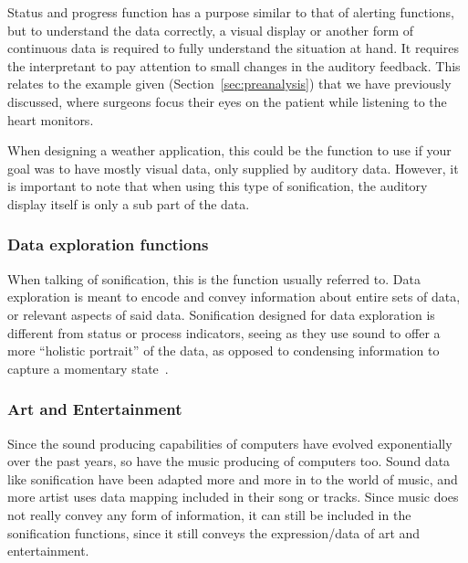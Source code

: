Status and progress function has a purpose similar to that of alerting functions, but to understand the data correctly, a visual display or another form of continuous data is required to fully understand the situation at hand. 
It requires the interpretant to pay attention to small changes in the auditory feedback. 
This relates to the example given (Section~\ref{sec:preanalysis}) that we have previously discussed, where surgeons focus their eyes on the patient while listening to the heart monitors.

When designing a weather application, this could be the function to use if your goal was to have mostly visual data, only supplied by auditory data. 
However, it is important to note that when using this type of sonification, the auditory display itself is only a sub part of the data. 



\subsubsection*{Data exploration functions} %
\label{ssub:data_exploration_functions}

When talking of sonification, this is the function usually referred to. 
Data exploration is meant to encode and convey information about entire sets of data, or relevant aspects of said data.
Sonification designed for data exploration is different from status or process indicators, seeing as they use sound to offer a more \enquote{holistic portrait} of the data, as opposed to condensing information to capture a momentary state~\cite*{walker2011}.



\subsubsection*{Art and Entertainment} %
\label{ssub:art_and_entertainment}

Since the sound producing capabilities of computers have evolved exponentially over the past years, so have the music producing of computers too. 
Sound data like sonification have been adapted more and more in to the world of music, and more artist uses data mapping included in their song or tracks. 
Since music does not really convey any form of information, it can still be included in the sonification functions, since it still conveys the expression/data of art and entertainment.

